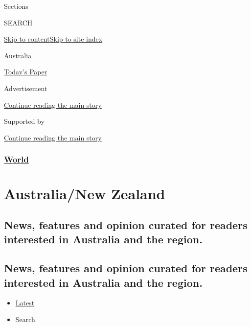 Sections

SEARCH

\protect\hyperlink{site-content}{Skip to
content}\protect\hyperlink{site-index}{Skip to site index}

\href{https://www.nytimes3xbfgragh.onion/section/world/australia}{Australia}

\href{https://myaccount.nytimes3xbfgragh.onion/auth/login?response_type=cookie\&client_id=vi}{}

\href{https://www.nytimes3xbfgragh.onion/section/todayspaper}{Today's
Paper}

Advertisement

\protect\hyperlink{after-top}{Continue reading the main story}

Supported by

\protect\hyperlink{after-sponsor}{Continue reading the main story}

\hypertarget{world}{%
\subsubsection{\texorpdfstring{\href{/section/world}{World}}{World}}\label{world}}

\hypertarget{australianew-zealand}{%
\section{Australia/New Zealand}\label{australianew-zealand}}

\hypertarget{news-features-and-opinion-curated-for-readers-interested-in-australia-and-the-region}{%
\subsection{News, features and opinion curated for readers interested in
Australia and the
region.}\label{news-features-and-opinion-curated-for-readers-interested-in-australia-and-the-region}}

\hypertarget{news-features-and-opinion-curated-for-readers-interested-in-australia-and-the-region-1}{%
\subsection{News, features and opinion curated for readers interested in
Australia and the
region.}\label{news-features-and-opinion-curated-for-readers-interested-in-australia-and-the-region-1}}

\begin{itemize}
\tightlist
\item
  \protect\hyperlink{stream-panel}{Latest}
\item
  Search
\end{itemize}

